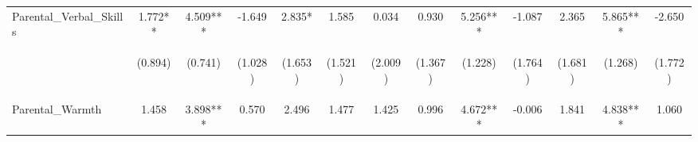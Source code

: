 \begin{tabular}{lcccccccccccc}
\noalign{\smallskip}Parental_Verbal_Skills & 1.772** & 4.509*** & -1.649 & 2.835* & 1.585 & 0.034 & 0.930 & 5.256*** & -1.087 & 2.365 & 5.865*** & -2.650\\
 & \begin{footnotesize}(0.894)\end{footnotesize} & \begin{footnotesize}(0.741)\end{footnotesize} & \begin{footnotesize}(1.028)\end{footnotesize} & \begin{footnotesize}(1.653)\end{footnotesize} & \begin{footnotesize}(1.521)\end{footnotesize} & \begin{footnotesize}(2.009)\end{footnotesize} & \begin{footnotesize}(1.367)\end{footnotesize} & \begin{footnotesize}(1.228)\end{footnotesize} & \begin{footnotesize}(1.764)\end{footnotesize} & \begin{footnotesize}(1.681)\end{footnotesize} & \begin{footnotesize}(1.268)\end{footnotesize} & \begin{footnotesize}(1.772)\end{footnotesize}\\
\noalign{\smallskip}Parental_Warmth & 1.458 & 3.898*** & 0.570 & 2.496 & 1.477 & 1.425 & 0.996 & 4.672*** & -0.006 & 1.841 & 4.838*** & 1.060\\

\end{tabular}

